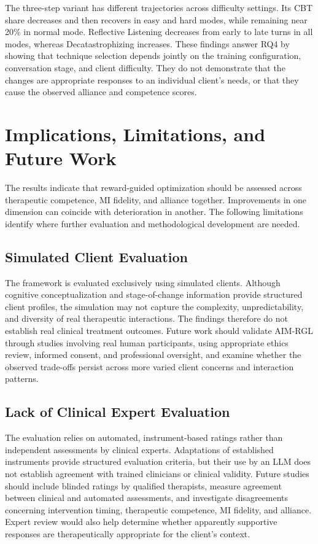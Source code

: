 The three-step variant has different trajectories across difficulty settings. Its CBT share decreases and then recovers in easy and hard modes, while remaining near 20\% in normal mode. Reflective Listening decreases from early to late turns in all modes, whereas Decatastrophizing increases. These findings answer RQ4 by showing that technique selection depends jointly on the training configuration, conversation stage, and client difficulty. They do not demonstrate that the changes are appropriate responses to an individual client's needs, or that they cause the observed alliance and competence scores.

\section{Implications, Limitations, and Future Work}

The results indicate that reward-guided optimization should be assessed across therapeutic competence, MI fidelity, and alliance together. Improvements in one dimension can coincide with deterioration in another. The following limitations identify where further evaluation and methodological development are needed.

\subsection{Simulated Client Evaluation}

The framework is evaluated exclusively using simulated clients. Although cognitive conceptualization and stage-of-change information provide structured client profiles, the simulation may not capture the complexity, unpredictability, and diversity of real therapeutic interactions. The findings therefore do not establish real clinical treatment outcomes. Future work should validate AIM-RGL through studies involving real human participants, using appropriate ethics review, informed consent, and professional oversight, and examine whether the observed trade-offs persist across more varied client concerns and interaction patterns.

\subsection{Lack of Clinical Expert Evaluation}

The evaluation relies on automated, instrument-based ratings rather than independent assessments by clinical experts. Adaptations of established instruments provide structured evaluation criteria, but their use by an LLM does not establish agreement with trained clinicians or clinical validity. Future studies should include blinded ratings by qualified therapists, measure agreement between clinical and automated assessments, and investigate disagreements concerning intervention timing, therapeutic competence, MI fidelity, and alliance. Expert review would also help determine whether apparently supportive responses are therapeutically appropriate for the client's context.

